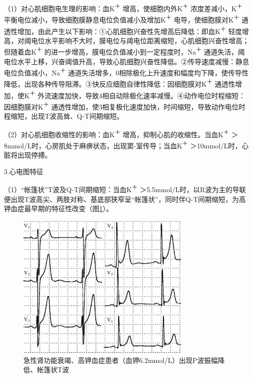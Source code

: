 （1）对心肌细胞电生理的影响：血K\textsuperscript{＋}
增高，使细胞内外K\textsuperscript{＋} 浓度差减小，K\textsuperscript{＋}
平衡电位减小，导致细胞膜静息电位负值减小及增加K\textsuperscript{＋}
电导，使细胞膜对K\textsuperscript{＋}
通透性增加，由此产生以下影响：①心肌细胞兴奋性先增高后降低：即血K\textsuperscript{＋}
轻度增高，对阈电位水平影响不大时，膜电位与阈电位距离缩短，心肌细胞兴奋性增高；但随着血K\textsuperscript{＋}
的进一步增高，膜电位负值减小到一定程度时，Na\textsuperscript{＋}
通道失活，阈电位水平上移，兴奋阈值升高，导致心肌细胞兴奋性降低。②传导速度减慢：静息电位负值减小，Na\textsuperscript{＋}
通道失活增多，0相除极化上升速度和幅度均下降，使传导性降低，出现各种传导阻滞。③快反应细胞自律性降低：因细胞膜对K\textsuperscript{＋}
通透性增加，使K\textsuperscript{＋}
外流速度加快，导致4相自动除极化速率减慢。④动作电位时程缩短：因细胞膜对K\textsuperscript{＋}
通透性增加，使3相复极化速度加快，时间缩短，导致动作电位时程缩短，出现T波高耸、Q-T间期缩短。

（2）对心肌细胞收缩性的影响：血K\textsuperscript{＋}
增高，抑制心肌的收缩性。当血K\textsuperscript{＋}
＞8mmol/L时，心房肌处于麻痹状态，出现窦-室传导；当血K\textsuperscript{＋}
＞10mmol/L时，心脏将出现停搏。

3.心电图特征

（1）“帐篷状”T波及Q-T间期缩短：当血K\textsuperscript{＋}
＞5.5mmol/L时，以R波为主的导联便出现T波高尖、两肢对称、基底部狭窄呈“帐篷状”，同时伴Q-T间期缩短，为高钾血症最早期的特征性改变（图\ref{fig45-4}）。

\begin{figure}[!htbp]
 \centering
 \includegraphics[width=3.38542in,height=2.84375in]{./images/Image00732.jpg}
 \captionsetup{justification=centering}
 \caption{急性肾功能衰竭、高钾血症患者（血钾6.2mmol/L）出现P波振幅降低、帐篷状T波}
 \label{fig45-4}
  \end{figure} 

